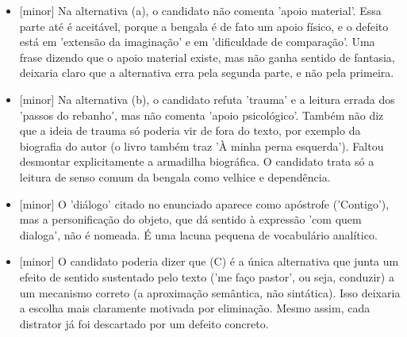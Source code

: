 \documentclass{article}%
\begin{document}
\begin{itemize}%
\item%
{[}minor{]} Na alternativa (a), o candidato não comenta 'apoio material'. Essa parte até é aceitável, porque a bengala é de fato um apoio físico, e o defeito está em 'extensão da imaginação' e em 'dificuldade de comparação'. Uma frase dizendo que o apoio material existe, mas não ganha sentido de fantasia, deixaria claro que a alternativa erra pela segunda parte, e não pela primeira.%
\item%
{[}minor{]} Na alternativa (b), o candidato refuta 'trauma' e a leitura errada dos 'passos do rebanho', mas não comenta 'apoio psicológico'. Também não diz que a ideia de trauma só poderia vir de fora do texto, por exemplo da biografia do autor (o livro também traz 'À minha perna esquerda'). Faltou desmontar explicitamente a armadilha biográfica. O candidato trata só a leitura de senso comum da bengala como velhice e dependência.%
\item%
{[}minor{]} O 'diálogo' citado no enunciado aparece como apóstrofe ('Contigo'), mas a personificação do objeto, que dá sentido à expressão 'com quem dialoga', não é nomeada. É uma lacuna pequena de vocabulário analítico.%
\item%
{[}minor{]} O candidato poderia dizer que (C) é a única alternativa que junta um efeito de sentido sustentado pelo texto ('me faço pastor', ou seja, conduzir) a um mecanismo correto (a aproximação semântica, não sintática). Isso deixaria a escolha mais claramente motivada por eliminação. Mesmo assim, cada distrator já foi descartado por um defeito concreto.%
\end{itemize}%
\end{document}
